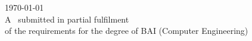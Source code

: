 \begin{titlepage}
{\large \today}\\[2cm] %

 
 A \typeofthesis\ submitted in partial fulfilment\\of the requirements for the degree of BAI (Computer Engineering)

\vfill %

\end{titlepage}
